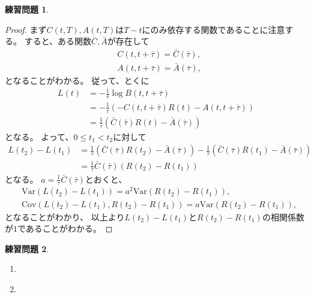 \documentclass[uplatex]{jsarticle}
\theoremstyle{definition}
\newtheorem{prob}[prob]{練習問題}
\newcommand{\Var}{\mathrm{Var}}
\newcommand{\Cov}{\mathrm{Cov}}
\begin{document}
\begin{prob}\label{prob: 10.5}
\end{prob}

\begin{proof}
  まず\(C(t,T),A(t,T)\)は\(T-t\)にのみ依存する関数であることに注意する。
  すると、ある関数\(\bar{C},\bar{A}\)が存在して
  \begin{align*}
    &C(t,t+\bar{\tau}) = \bar{C}(\bar{\tau}), \\
    &A(t,t+\bar{\tau}) = \bar{A}(\bar{\tau}),
  \end{align*}
  となることがわかる。
  従って、とくに
  \begin{align*}
    L(t) &= -\frac{1}{\bar{\tau}}\log B(t,t+\bar{\tau}) \\
    &= -\frac{1}{\bar{\tau}}\left(
    -C(t,t+\bar{\tau})R(t) - A(t,t+\bar{\tau})\right) \\
    &= \frac{1}{\bar{\tau}}
    \left( \bar{C}(\bar{\tau})R(t) - \bar{A}(\bar{\tau})\right)
  \end{align*}
  となる。
  よって、\(0\leq t_1 < t_2\)に対して
  \begin{align*}
    L(t_2)-L(t_1)
    &= \frac{1}{\bar{\tau}}
    \left( \bar{C}(\bar{\tau})R(t_2) - \bar{A}(\bar{\tau})\right)
    - \frac{1}{\bar{\tau}}
    \left( \bar{C}(\bar{\tau})R(t_1) - \bar{A}(\bar{\tau})\right) \\
    &= \frac{1}{\bar{\tau}} \bar{C}(\bar{\tau})\left( R(t_2) - R(t_1) \right)
  \end{align*}
  となる。
  \(a = \frac{1}{\bar{\tau}} \bar{C}(\bar{\tau})\)とおくと、
  \begin{align*}
    &\Var (L(t_2)-L(t_1)) = a^2 \Var(R(t_2)-R(t_1)), \\
    &\Cov (L(t_2)-L(t_1),R(t_2)-R(t_1)) = a \Var(R(t_2)-R(t_1)),
  \end{align*}
  となることがわかり、
  以上より\(L(t_2)-L(t_1)\)と\(R(t_2)-R(t_1)\)の相関係数が\(1\)であることがわかる。
\end{proof}
















\begin{prob}\label{prob: 10.6}
  \begin{enumerate}
    \item \label{enumi: 10.6-1}
    \item \label{enumi: 10.6-2}
  \end{enumerate}
\end{prob}
\end{document}
